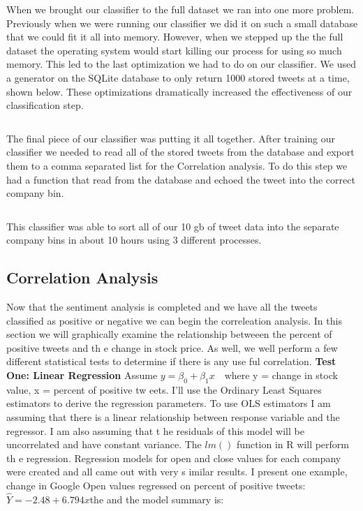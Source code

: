 \documentclass{acm_proc_article-sp}
\begin{document}
When we brought our classifier to the full dataset we ran into one more
problem.  Previously when we were running our classifier we did it on such a
small database that we could fit it all into memory. However, when we stepped
up the the full dataset the operating system would start killing our process
for using so much memory. This led to the last optimization we had to do on our
classifier. We used a generator on the SQLite database to only return 1000
stored tweets at a time, shown below. These optimizations dramatically
increased the effectiveness of our classification step.

\inputminted{python}{examples/generator.py}

The final piece of our classifier was putting it all together. After training
our classifier we needed to read all of the stored tweets from the database and
export them to a comma separated list for the Correlation analysis. To do this
step we had a function that read from the database and echoed the tweet into
the correct company bin.

\inputminted{python}{examples/converter.py}

This classifier was able to sort all of our 10 gb of tweet data into the
separate company bins in about 10 hours using 3 different processes. 

\subsection{Correlation Analysis}

Now that the sentiment analysis is completed and we have all the tweets
classified as positive or negative we can begin the correleation analysis.
\newline In this section we will graphically examine the relationship betweeen
the percent of positive tweets and th e change in stock price. As well, we well
perform a few different statistical tests to determine if there is any use ful
correlation.  \newline\textbf{  Test One: Linear Regression} \newline\indent
Assume $ y = \beta_0  + \beta_1x\ \ \  $ where y = change in stock value, x =
percent of positive tw eets. I'll use the Ordinary Least Squares estimators to
derive the regression parameters. To use OLS estimators I am assuming that
there is a linear relationship between response variable and the regressor. I
am also assuming that t he residuals of this model will be uncorrelated and
have constant variance. The $lm()$ function in R will perform th e regression.
Regression models for open and close values for each company were created and
all came out with very s imilar results. I present one example, change in
Google Open values regressed on percent of positive tweets: \newline\indent
$\hat{Y} = -2.48 + 6.794 x$the \newline\indent and the model summary is:
\end{document}
